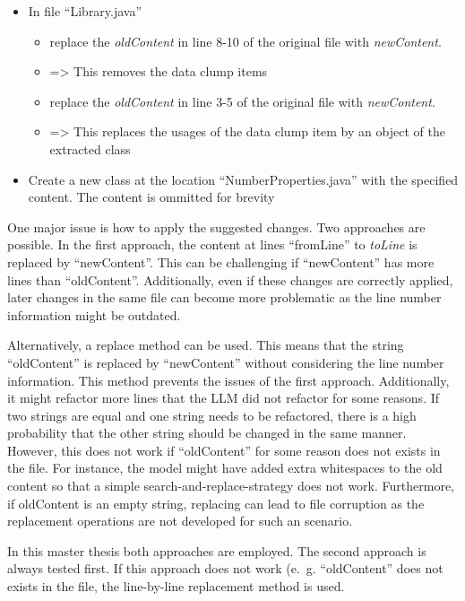 \begin{itemize}
    \item In file \enquote{Library.java}
    \begin{itemize}
        \item replace the \textit{oldContent} in line 8-10 of the original file with \textit{newContent}.
        \item => This removes the data clump items
       \item replace the \textit{oldContent} in line 3-5 of the original file with \textit{newContent}.
        \item => This replaces the usages of the data clump item by an object of the extracted class 
    \end{itemize}
    \item Create a new class at the location \enquote{NumberProperties.java} with the specified content. The content is ommitted for brevity
\end{itemize}



One major issue is how to apply the suggested changes. Two approaches are possible.
In the first approach, the content at lines \enquote{fromLine} to \textit{toLine} is replaced by \enquote{newContent}. This can be challenging if \enquote{newContent} has more lines than \enquote{oldContent}. Additionally, even if these  changes are correctly applied, later changes in the same file can become more problematic as the line number information might be outdated. 

Alternatively, a replace method can be used. This means that the string \enquote{oldContent} is replaced by \enquote{newContent} without considering the line number information. This method prevents the issues of the first approach. Additionally, it might refactor more lines that the \ac{LLM} did not refactor for some reasons. If two strings are equal and one string needs to be refactored, there is a high probability that the other string should be changed in the same manner. However, this does not work if \enquote{oldContent} for some reason does not exists in the file. For instance, the model might have added extra whitespaces to the old content so that a simple search-and-replace-strategy does not work. Furthermore, if oldContent is an empty string, replacing can lead to file corruption as the replacement operations are not developed for such an scenario. 

In this master thesis both approaches are employed. The second approach is always tested first. If this approach does not work (e.~g. \enquote{oldContent} does not exists in the file, the line-by-line replacement method is used.  


